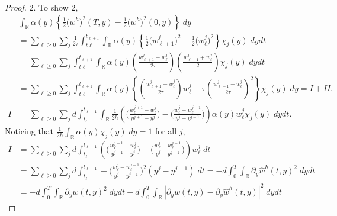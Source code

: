 \documentclass[a4paper,11pt]{article}
\theoremstyle{remark}
\begin{document}
\begin{proof}
2. To show 2,
\begin{align*}
    &\int_\mathbb{R} \alpha(y) \left\{\frac{1}{2} \big(\bar{w}^h\big)^2(T,y) - \frac{1}{2}\big(\bar{w}^h\big)^2(0,y)\right\} \; dy\\
    &=\sum_{\ell\ge0}\sum_j\frac{1}{2\tau}\int_{t\ell}^{t_{\ell+1}}\int_\mathbb{R} \alpha(y) \left\{\frac{1}{2} \big(w_{\ell+1}^j\big)^2 - \frac{1}{2}\big(w_{\ell}^j\big)^2\right\} \chi_j(y)\; dydt\\
    &=\sum_{\ell\ge0}\sum_j\int_{t\ell}^{t_{\ell+1}}\int_\mathbb{R} \alpha(y) \left(\tfrac{w_{\ell+1}^j-w_{\ell}^j}{2\tau}\right)\left(\tfrac{w_{\ell+1}^j+w_{\ell}^j}{2}\right) \chi_j(y)\; dydt\\
    &=\sum_{\ell\ge0}\sum_j\int_{t\ell}^{t_{\ell+1}}\int_\mathbb{R} \alpha(y) \left\{\left(\tfrac{w_{\ell+1}^j-w_{\ell}^j}{2\tau}\right)w_\ell^j + \tau\left(\tfrac{w_{\ell+1}^j-w_{\ell}^j}{2\tau}\right)^2\right\} \chi_j(y)\; dy=I + II.\\    
    I&= \sum_{\ell\ge0}\sum_{j}d\int_{t_\ell}^{t_{\ell+1}}\int_\mathbb{R} \tfrac{1}{2h} \left( \Big(\tfrac{w^{j+1}_{\ell} - w^{j}_{\ell}}{y^{j+1}-y^j}\Big) -\Big(\tfrac{w^{j}_{\ell} - w^{j-1}_{\ell}}{y^{j}-y^{j-1}} \Big)\right) \alpha(y)w^j_\ell\chi_j(y)\; dy dt.
\end{align*}
Noticing that $\frac{1}{2h}\int_\mathbb{R} \alpha(y)\chi_j(y)\; dy=1$ for all $j$,
\begin{align*}
    I&= \sum_{\ell\ge0}\sum_{j}d\int_{t_\ell}^{t_{\ell+1}}\left( \Big(\tfrac{w^{j+1}_{\ell} - w^{j}_{\ell}}{y^{j+1}-y^j}\Big) -\Big(\tfrac{w^{j}_{\ell} - w^{j-1}_{\ell}}{y^{j}-y^{j-1}} \Big)\right) w^j_\ell\; dt\\
    &= \sum_{\ell\ge0}\sum_{j}d\int_{t_\ell}^{t_{\ell+1}}-\Big(\tfrac{w^{j}_{\ell} - w^{j-1}_{\ell}}{y^{j}-y^{j-1}} \Big)^2 (y^j-y^{j-1})\; dt = -d \int_0^T\int_\mathbb{R} \partial_y\hat{w}^h(t,y)^2\;dydt \\
    &= -d\int_0^T\int_\mathbb{R} \partial_y w(t,y)^2\;dydt -d \int_0^T\int_\mathbb{R} |\partial_y w(t,y)-\partial_y\hat{w}^h(t,y)|^2\;dydt%

\end{align*}
\end{proof}
\end{document}
